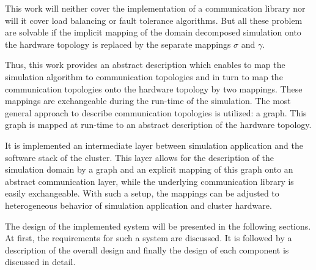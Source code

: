This work will neither cover the implementation of a communication library
nor will it cover load balancing or fault tolerance algorithms. But all
these problem are solvable if the implicit mapping of the domain
decomposed simulation onto the hardware topology is replaced by the
separate mappings $\sigma$ and $\gamma$.

Thus, this work provides an abstract description which enables to map
the simulation algorithm to communication topologies and in turn to
map the communication topologies onto the hardware topology by two
mappings. These mappings are exchangeable during the run-time of the
simulation. The most general approach to describe communication
topologies is utilized: a graph. This graph is mapped at run-time
to an abstract description of the hardware topology.

It is implemented an intermediate layer between simulation application
and the software stack of the cluster. This layer allows for the
description of the simulation domain by a graph and an explicit
mapping of this graph onto an abstract communication layer, while the
underlying communication library is easily exchangeable. With such a
setup, the mappings can be adjusted to heterogeneous behavior of
simulation application and cluster hardware.

The design of the implemented system will be presented in the
following sections. At first, the requirements for such a system are
discussed. It is followed by a description of the overall design and
finally the design of each component is discussed in detail.



